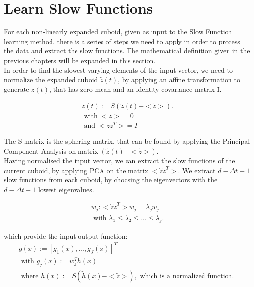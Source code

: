 \documentclass[11pt]{report}
\begin{document}

\section{Learn Slow Functions}
For each non-linearly expanded cuboid, given as input to the Slow Function learning method, there is a series of steps we need to apply in order to process the data and extract the slow functions. The mathematical definition given in the previous chapters will be expanded in this section. \\
In order to find the slowest varying elements of the input vector, we need to normalize the expanded cuboid \(\tilde{z}(t)\), by applying an affine transformation to generate \(z(t)\), that has zero mean and an identity covariance matrix I.

\begin{equation}
\begin{multlined}
z(t) := S(\tilde{z}(t) - <\tilde{z}>). \\
\text{ with } <z> = 0\\
\text{ and } <zz^T> = I
\end{multlined}
\end{equation}

The S matrix is the sphering matrix, that can be found by applying the Principal Component Analysis on matrix \((\tilde{z}(t) - <\tilde{z}>)\).\\
Having normalized the input vector, we can extract the slow functions of the current cuboid, by applying PCA on the matrix \(<\dot{z}\dot{z}^T>\). We extract \(d - \Delta t - 1\) slow functions from each cuboid, by choosing the eigenvectors with the \( d - \Delta t - 1\) lowest eigenvalues. 

\begin{equation}
\begin{multlined}
w_j: <\dot{z} \dot{z}^T>w_j = \lambda_j w_j\\
\text{ with } \lambda_1 \leq \lambda_2 \leq ... \leq \lambda_j.
\end{multlined}
\end{equation}

which provide the input-output function: 
\begin{equation}
\begin{multlined}
g(x) := [g_1(x), ..., g_J(x)]^T\\
\text{ with } g_j(x) := w_j^T h(x)\\
\text{ where } h(x) := S(\tilde{h}(x) - <\tilde{z}>), \text{ which is a normalized function. }
\end{multlined}
\end{equation}
\end{document}
